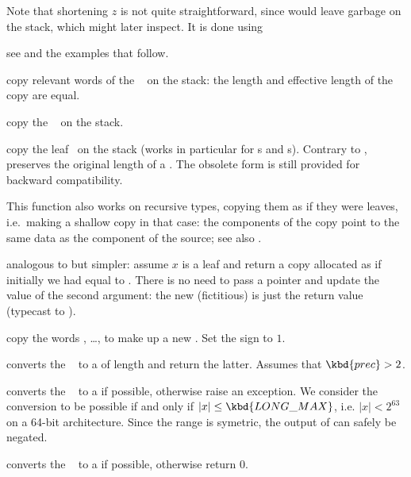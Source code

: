 Note that shortening $z$ is not quite straightforward, since 
would leave garbage on the stack, which  might later inspect.
It is done using

 see  and the examples that
follow.


 copy relevant words of the ~ on the
stack: the length and effective length of the copy are equal.

 copy the ~ on the stack.

 copy the leaf~ on the
stack (works in particular for s and s).
Contrary to ,  preserves the original
length of a . The obsolete form 
is still provided for backward compatibility.

This function also works on recursive types, copying them as if they were
leaves, i.e.~making a shallow copy in that case: the components of the copy
point to the same data as the component of the source; see also
.

 analogous to 
but simpler: assume $x$ is a leaf and return a copy allocated as if
initially we had  equal to . There is no need to pass a
pointer and update the value of the second argument: the new (fictitious)
 is just the return value (typecast to ).

 copy the  words
, \dots,  to make up a new . Set the sign
to $1$.


 converts the ~ to a
 of length  and return the latter.
Assumes that $\kbd{prec} > 2$.

 converts the ~ to a  if
possible, otherwise raise an exception. We consider the conversion
to be possible if and only if $|x| \leq \kbd{LONG\_MAX}$, i.e. $|x| < 2^{63}$
on a 64-bit architecture. Since the range is symetric, the output of
 can safely be negated.

 converts the ~ to a  if
possible, otherwise return $0$.

